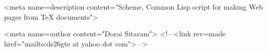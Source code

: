 \htmlheadonly
<meta name=description content="Scheme, Common Lisp script for making Web pages
from TeX documents">

<meta name=author content="Dorai Sitaram">
<!-- <link rev=made href="mailto:ds26gte at yahoo dot com"> -->

\endhtmlheadonly

\ifx{}
\def\spaceifnotempty{\eval{
(let ((x (ungroup (get-token))))
  (unless (all-blanks-p x)
    (princ (code-char 92))
    (princ "space")))}}
\else
\def\spaceifnotempty{\eval{
(let ((x (ungroup (get-token))))
  (if (not (all-blanks-p x))
      (begin (display (integer->char 92))
             (display "space"))
      0))
}}
\fi
